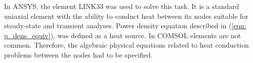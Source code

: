 In ANSYS, the element LINK33 was used to solve this task. It is a standard uniaxial element with the ability to conduct heat between its nodes suitable for steady-state and transient analyses. Power density equation described in (\ref{eqn: p_dens_equiv}), was defined as a heat source. In COMSOL elements are not common. Therefore, the algebraic physical equations related to heat conduction problems between the nodes had to be specified.